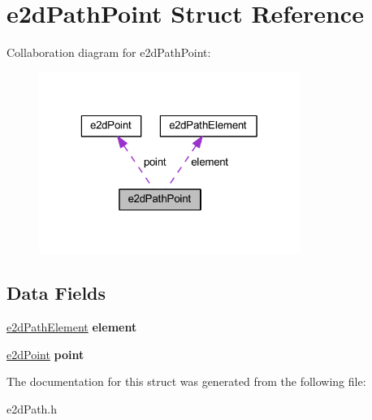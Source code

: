 \hypertarget{structe2dPathPoint}{\section{e2d\-Path\-Point Struct Reference}
\label{structe2dPathPoint}
}


Collaboration diagram for e2d\-Path\-Point\-:
\nopagebreak
\begin{figure}[H]
\begin{center}
\leavevmode
\includegraphics[width=241pt]{structe2dPathPoint__coll__graph}
\end{center}
\end{figure}
\subsection*{Data Fields}
\begin{DoxyCompactItemize}
\item 
\hypertarget{structe2dPathPoint_a88e514266530010a1a3b08198b3cc763}{\hyperlink{structe2dPathElement}{e2d\-Path\-Element} {\bfseries element}}\label{structe2dPathPoint_a88e514266530010a1a3b08198b3cc763}

\item 
\hypertarget{structe2dPathPoint_afff60c971a4d4728af80b4753d30c5bf}{\hyperlink{structe2dPoint}{e2d\-Point} {\bfseries point}}\label{structe2dPathPoint_afff60c971a4d4728af80b4753d30c5bf}

\end{DoxyCompactItemize}


The documentation for this struct was generated from the following file\-:\begin{DoxyCompactItemize}
\item 
e2d\-Path.\-h\end{DoxyCompactItemize}
